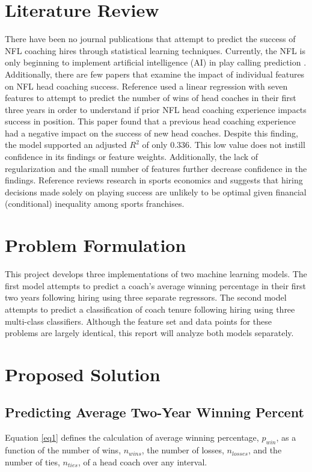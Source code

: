 \documentclass[conference]{IEEEtran}
\begin{document}
\section{Literature Review}
There have been no journal publications that attempt to predict the success of NFL coaching hires through statistical learning techniques. Currently, the NFL is only beginning to implement artificial intelligence (AI) in play calling prediction \cite{b4}. Additionally, there are few papers that examine the impact of individual features on NFL head coaching success. Reference \cite{b5} used a linear regression with seven features to attempt to predict the number of wins of head coaches in their first three years in order to understand if prior NFL head coaching experience impacts success in position. This paper found that a previous head coaching experience had a negative impact on the success of new head coaches. Despite this finding, the model supported an adjusted $R^2$ of only $0.336$. This low value does not instill confidence in its findings or feature weights. Additionally, the lack of regularization and the small number of features further decrease confidence in the findings. Reference \cite{b6} reviews research in sports economics and suggests that hiring decisions made solely on playing success are unlikely to be optimal given financial (conditional) inequality among sports franchises. 

\section{Problem Formulation}
This project develops three implementations of two machine learning models. The first model attempts to predict a coach's average winning percentage in their first two years following hiring using three separate regressors. The second model attempts to predict a classification of coach tenure following hiring using three multi-class classifiers. Although the feature set and data points for these problems are largely identical, this report will analyze both models separately.

\section{Proposed Solution}

\subsection{Predicting Average Two-Year Winning Percent}
Equation \eqref{eq1} defines the calculation of average winning percentage, $p_{win}$, as a function of the number of wins, $n_{wins}$, the number of losses, $n_{losses}$, and the number of ties, $n_{ties}$, of a head coach over any interval. 
\end{document}

